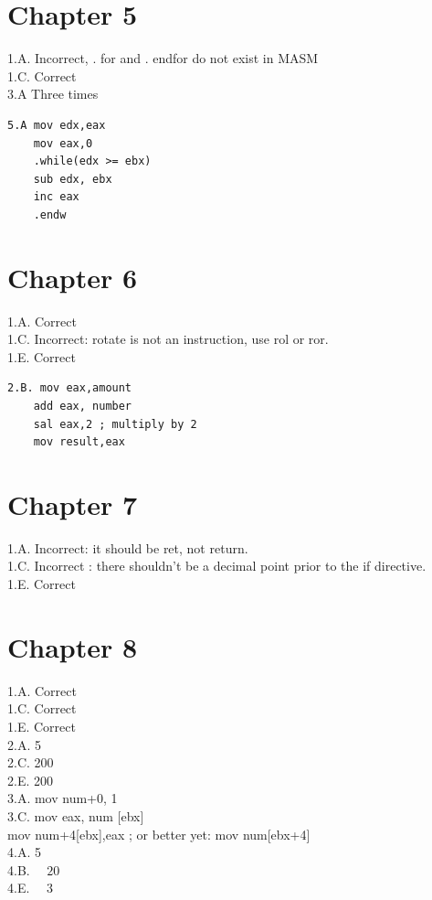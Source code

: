 \documentclass[10pt]{article}
\begin{document}
\section*{Chapter 5}
1.A. Incorrect, . for and . endfor do not exist in MASM\\
1.C. Correct\\
3.A Three times

\begin{verbatim}
5.A mov edx,eax
    mov eax,0
    .while(edx >= ebx)
    sub edx, ebx
    inc eax
    .endw
\end{verbatim}

\section*{Chapter 6}
1.A. Correct\\
1.C. Incorrect: rotate is not an instruction, use rol or ror.\\
1.E. Correct

\begin{verbatim}
2.B. mov eax,amount
    add eax, number
    sal eax,2 ; multiply by 2
    mov result,eax
\end{verbatim}

\section*{Chapter 7}
1.A. Incorrect: it should be ret, not return.\\
1.C. Incorrect : there shouldn't be a decimal point prior to the if directive.\\
1.E. Correct

\section*{Chapter 8}
1.A. Correct\\
1.C. Correct\\
1.E. Correct\\
2.A. 5\\
2.C. 200\\
2.E. 200\\
3.A. mov num+0, 1\\[0pt]
3.C. mov eax, num [ebx]\\[0pt]
mov num+4[ebx],eax ; or better yet: mov num[ebx+4]\\
4.A. 5\\
4.B. $\quad 20$\\
4.E. $\quad 3$
\end{document}
